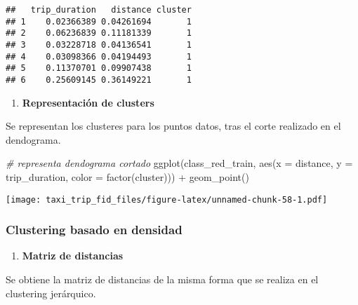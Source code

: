 \documentclass[
]{article}
\newenvironment{Shaded}{\begin{snugshade}}{\end{snugshade}}
\newcommand{\AttributeTok}[1]{\textcolor[rgb]{0.77,0.63,0.00}{#1}}
\newcommand{\CommentTok}[1]{\textcolor[rgb]{0.56,0.35,0.01}{\textit{#1}}}
\newcommand{\DecValTok}[1]{\textcolor[rgb]{0.00,0.00,0.81}{#1}}
\newcommand{\FunctionTok}[1]{\textcolor[rgb]{0.00,0.00,0.00}{#1}}
\newcommand{\NormalTok}[1]{#1}
\newcommand{\OtherTok}[1]{\textcolor[rgb]{0.56,0.35,0.01}{#1}}
\newcommand{\SpecialCharTok}[1]{\textcolor[rgb]{0.00,0.00,0.00}{#1}}
\providecommand{\tightlist}{%
  \setlength{\itemsep}{0pt}\setlength{\parskip}{0pt}}
\begin{document}
\begin{verbatim}
##   trip_duration   distance cluster
## 1    0.02366389 0.04261694       1
## 2    0.06236839 0.11181339       1
## 3    0.03228718 0.04136541       1
## 4    0.03098366 0.04194493       1
## 5    0.11370701 0.09907438       1
## 6    0.25609145 0.36149221       1
\end{verbatim}

\begin{enumerate}
\def\labelenumi{\arabic{enumi}.}
\setcounter{enumi}{5}
\tightlist
\item
  \textbf{Representación de clusters}
\end{enumerate}

Se representan los clusteres para los puntos datos, tras el corte
realizado en el dendograma.

\begin{Shaded}
\begin{Highlighting}[]
\CommentTok{\# representa dendograma cortado}
\FunctionTok{ggplot}\NormalTok{(class\_red\_train, }\FunctionTok{aes}\NormalTok{(}\AttributeTok{x =}\NormalTok{ distance, }\AttributeTok{y =}\NormalTok{ trip\_duration, }\AttributeTok{color =} \FunctionTok{factor}\NormalTok{(cluster))) }\SpecialCharTok{+} \FunctionTok{geom\_point}\NormalTok{()}
\end{Highlighting}
\end{Shaded}

\texttt{[image: taxi\_trip\_fid\_files/figure-latex/unnamed-chunk-58-1.pdf]}

\hypertarget{clustering-basado-en-densidad}{%
\subsubsection{Clustering basado en
densidad}\label{clustering-basado-en-densidad}}

\begin{enumerate}
\def\labelenumi{\arabic{enumi}.}
\tightlist
\item
  \textbf{Matriz de distancias}
\end{enumerate}

Se obtiene la matriz de distancias de la misma forma que se realiza en
el clustering jerárquico.

\begin{Shaded}
\end{Shaded}
\end{document}

